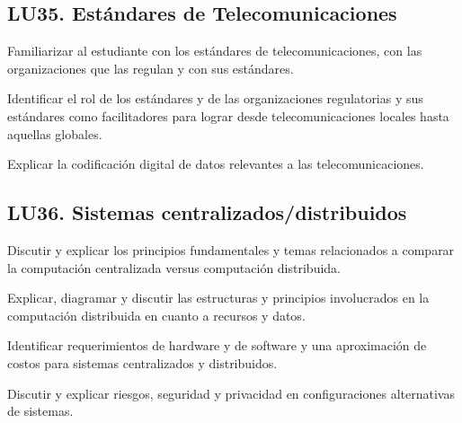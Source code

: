 \subsection{LU35. Estándares de Telecomunicaciones}\label{sec:BOK-LU35}\label{sec:LU35}
\begin{LearningUnit}
\begin{LUGoal}
\item Familiarizar al estudiante con los estándares de telecomunicaciones, con las organizaciones que las regulan y con sus estándares.
\end{LUGoal}

\begin{LUObjective}
\item Identificar el rol de los estándares y de las organizaciones regulatorias y sus estándares como facilitadores para lograr desde telecomunicaciones locales hasta aquellas globales.
\item Explicar la codificación digital de datos relevantes a las telecomunicaciones.
\end{LUObjective}
\end{LearningUnit}

\subsection{LU36. Sistemas centralizados/distribuidos}\label{sec:BOK-LU36}\label{sec:LU36}
\begin{LearningUnit}
\begin{LUGoal}
\item Discutir y explicar los principios fundamentales y temas relacionados a comparar la computación centralizada versus computación distribuida.
\end{LUGoal}

\begin{LUObjective}
\item Explicar, diagramar y discutir las estructuras y principios involucrados en la computación distribuida en cuanto a recursos y datos.
\item Identificar requerimientos de hardware y de software y una aproximación de costos para sistemas centralizados y distribuidos.
\item Discutir y explicar riesgos, seguridad y privacidad en configuraciones alternativas de sistemas.
\end{LUObjective}
\end{LearningUnit}

